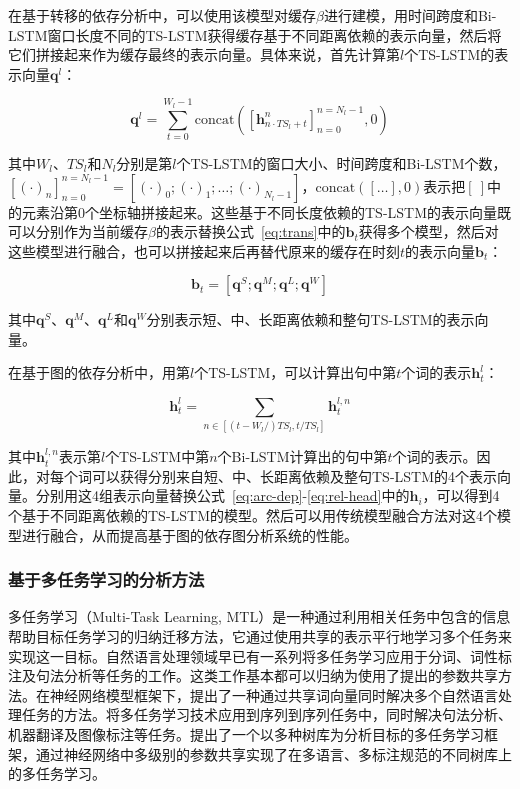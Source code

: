 在基于转移的依存分析中，可以使用该模型对缓存$\beta$进行建模，用时间跨度和Bi-LSTM窗口长度不同的TS-LSTM获得缓存基于不同距离依赖的表示向量，然后将它们拼接起来作为缓存最终的表示向量。具体来说，首先计算第$l$个TS-LSTM的表示向量$\mathbf{q}^l$：

\begin{equation}
\mathbf{q}^l = \sum^{W_l-1}_{t=0} \text{concat}([\mathbf{h}^{n}_{n\cdot TS_l + t}]^{n=N_l-1}_{n=0},0)
\end{equation}

其中$W_l$、$TS_l$和$N_l$分别是第$l$个TS-LSTM的窗口大小、时间跨度和Bi-LSTM个数，$[(\cdot)_n]^{n=N_l-1}_{n=0} = [(\cdot)_0;(\cdot)_1;\dots;(\cdot)_{N_l-1}]$，$\text{concat}([\dots],0)$表示把$[\ ]$中的元素沿第$0$个坐标轴拼接起来。这些基于不同长度依赖的TS-LSTM的表示向量既可以分别作为当前缓存$\beta$的表示替换公式~\ref{eq:trans}中的$\mathbf{b}_t$获得多个模型，然后对这些模型进行融合，也可以拼接起来后再替代原来的缓存在时刻$t$的表示向量$\mathbf{b}_t$：

\begin{equation}
\mathbf{b}_t = [\mathbf{q}^S;\mathbf{q}^M;\mathbf{q}^L;\mathbf{q}^W]
\end{equation}

其中$\mathbf{q}^S$、$\mathbf{q}^M$、$\mathbf{q}^L$和$\mathbf{q}^W$分别表示短、中、长距离依赖和整句TS-LSTM的表示向量。

在基于图的依存分析中，用第$l$个TS-LSTM，可以计算出句中第$t$个词的表示$\mathbf{h}^l_t$：

\begin{equation}
\mathbf{h}^l_t = \sum_{n \in [(t-W_l/)TS_l,t/TS_l]}\mathbf{h}^{l,n}_t
\end{equation}

其中$\mathbf{h}^{l,n}_t$表示第$l$个TS-LSTM中第$n$个Bi-LSTM计算出的句中第$t$个词的表示。因此，对每个词可以获得分别来自短、中、长距离依赖及整句TS-LSTM的4个表示向量。分别用这4组表示向量替换公式~\ref{eq:arc-dep}-\ref{eq:rel-head}中的$\mathbf{h}_i$，可以得到4个基于不同距离依赖的TS-LSTM的模型。然后可以用传统模型融合方法对这4个模型进行融合，从而提高基于图的依存图分析系统的性能。

\subsubsection{基于多任务学习的分析方法}

多任务学习（Multi-Task Learning, MTL）是一种通过利用相关任务中包含的信息帮助目标任务学习的归纳迁移方法，它通过使用共享的表示平行地学习多个任务来实现这一目标。自然语言处理领域早已有一系列将多任务学习应用于分词、词性标注及句法分析等任务的工作。这类工作基本都可以归纳为使用了提出的参数共享方法。在神经网络模型框架下，提出了一种通过共享词向量同时解决多个自然语言处理任务的方法。将多任务学习技术应用到序列到序列任务中，同时解决句法分析、机器翻译及图像标注等任务。提出了一个以多种树库为分析目标的多任务学习框架，通过神经网络中多级别的参数共享实现了在多语言、多标注规范的不同树库上的多任务学习。

